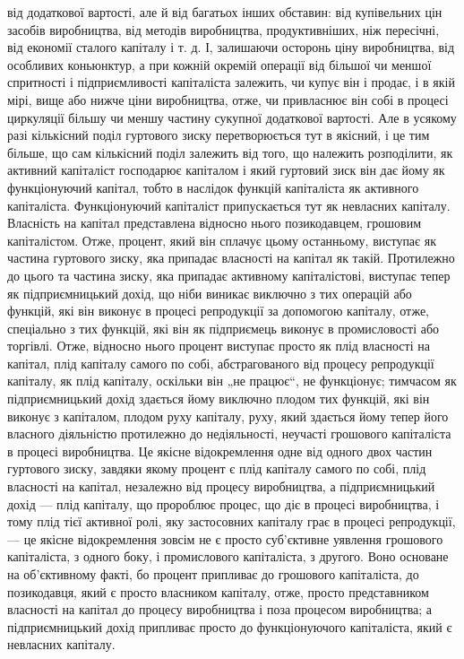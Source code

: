 \parcont{}  %
від додаткової вартості, але й від багатьох інших обставин: від
купівельних цін засобів виробництва, від методів виробництва,
продуктивніших, ніж пересічні, від економії сталого капіталу
і т. д. І, залишаючи осторонь ціну виробництва, від особливих
коньюнктур, а при кожній окремій операції від більшої чи меншої
спритності і підприємливості капіталіста залежить, чи купує
він і продає, і в якій мірі, вище або нижче ціни виробництва,
отже, чи привласнює він собі в процесі циркуляції більшу чи
меншу частину сукупної додаткової вартості. Але в усякому разі
кількісний поділ гуртового зиску перетворюється тут в якісний,
і це тим більше, що сам кількісний поділ залежить від того, що
належить розподілити, як активний капіталіст господарює капіталом
і який гуртовий зиск він дає йому як функціонуючий капітал,
тобто в наслідок функцій капіталіста як активного капіталіста.
Функціонуючий капіталіст припускається тут як невласних капіталу.
Власність на капітал представлена відносно нього позикодавцем,
грошовим капіталістом. Отже, процент, який він
сплачує цьому останньому, виступає як частина гуртового зиску,
яка припадає власності на капітал як такій. Протилежно до
цього та частина зиску, яка припадає активному капіталістові,
виступає тепер як підприємницький дохід, що ніби виникає виключно
з тих операцій або функцій, які він виконує в процесі
репродукції за допомогою капіталу, отже, спеціально з тих функцій,
які він як підприємець виконує в промисловості або торгівлі.
Отже, відносно нього процент виступає просто як плід власності
на капітал, плід капіталу самого по собі, абстрагованого від процесу
репродукції капіталу, як плід капіталу, оскільки він „не працює“,
не функціонує; тимчасом як підприємницький дохід здається
йому виключно плодом тих функцій, які він виконує з капіталом,
плодом руху капіталу, руху, який здається йому тепер його
власного діяльністю протилежно до недіяльності, неучасті грошового
капіталіста в процесі виробництва. Це якісне відокремлення
одне від одного двох частин гуртового зиску, завдяки якому
процент є плід капіталу самого по собі, плід власності на капітал,
незалежно від процесу виробництва, а підприємницький
дохід — плід капіталу, що пророблює процес, що діє в процесі
виробництва, і тому плід тієї активної ролі, яку застосовних
капіталу грає в процесі репродукції, — це якісне відокремлення
зовсім не є просто суб’єктивне уявлення грошового капіталіста,
з одного боку, і промислового капіталіста, з другого. Воно
основане на об’єктивному факті, бо процент припливає до грошового
капіталіста, до позикодавця, який є просто власником
капіталу, отже, просто представником власності на капітал до
процесу виробництва і поза процесом виробництва; а підприємницький
дохід припливає просто до функціонуючого капіталіста,
який є невласних капіталу.

